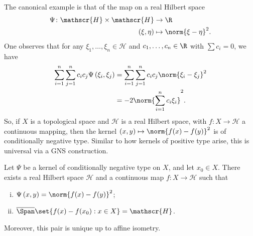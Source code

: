 \documentclass[10pt]{mypackage}
\begin{document}
The canonical example is that of the map on a real Hilbert space
\begin{align*}
  \Psi\colon \mathscr{H}\times \mathscr{H}&\to \R\\
  \left( \xi,\eta \right) &\mapsto \norm{\xi-\eta}^2.
\end{align*}
One observes that for any $\xi_1,\dots,\xi_n\in \mathscr{H}$ and $c_1,\dots,c_n\in \R$ with $\sum c_i = 0$, we have
\begin{align*}
  \sum_{i=1}^{n}\sum_{j=1}^{n}c_ic_j\Psi\left( \xi_i,\xi_j \right) &= \sum_{i=1}^{n}\sum_{j=1}^{n} c_ic_j \norm{\xi_i-\xi_j}^2\\
                                                                   &= -2\norm{\sum_{i=1}^{n}c_i\xi_i}^2.
\end{align*}
So, if $X$ is a topological space and $\mathscr{H}$ is a real Hilbert space, with $f\colon X\to \mathscr{H}$ a continuous mapping, then the kernel $\left( x,y \right)\mapsto \norm{f(x)-f(y)}^2$ is of conditionally negative type. Similar to how kernels of positive type arise, this is universal via a GNS construction.
\begin{theorem}
  Let $\Psi$ be a kernel of conditionally negative type on $X$, and let $x_0\in X$. There exists a real Hilbert space $ \mathscr{H} $ and a continuous map $f\colon X\to \mathscr{H}$ such that
  \begin{enumerate}[(i)]
    \item $\Psi\left( x,y \right) = \norm{f(x)-f(y)}^2$;
    \item $ \overline{\Span}\set{f(x) - f(x_0) : x\in X} = \mathscr{H}$.
  \end{enumerate}
  Moreover, this pair is unique up to affine isometry.
\end{theorem}
\end{document}
